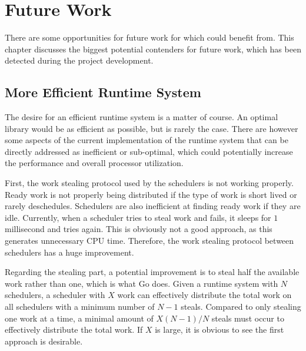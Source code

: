 

\chapter{Future Work}
\label{ch:future_work}


There are some opportunities for future work for which \Proxc{} could benefit from. This chapter discusses the biggest potential contenders for future work, which has been detected during the project development.


\section{More Efficient Runtime System}


The desire for an efficient runtime system is a matter of course. An optimal library would be as efficient as possible, but is rarely the case. There are however some aspects of the current implementation of the runtime system that can be directly addressed as inefficient or sub\hyp{}optimal, which could potentially increase the performance and overall processor utilization.

First, the work stealing protocol used by the schedulers is not working properly. Ready work is not properly being distributed if the type of work is short lived or rarely deschedules. Schedulers are also inefficient at finding ready work if they are idle. Currently, when a scheduler tries to steal work and fails, it sleeps for $1$ millisecond and tries again. This is obviously not a good approach, as this generates unnecessary CPU time. Therefore, the work stealing protocol between schedulers has a huge improvement.

Regarding the stealing part, a potential improvement is to steal half the available work rather than one, which is what Go does. Given a runtime system with $N$ schedulers, a scheduler with $X$ work can effectively distribute the total work on all schedulers with a minimum number of $N-1$ steals. Compared to only stealing one work at a time, a minimal amount of $X(N-1)/N$ steals must occur to effectively distribute the total work. If $X$ is large, it is obvious to see the first approach is desirable.

